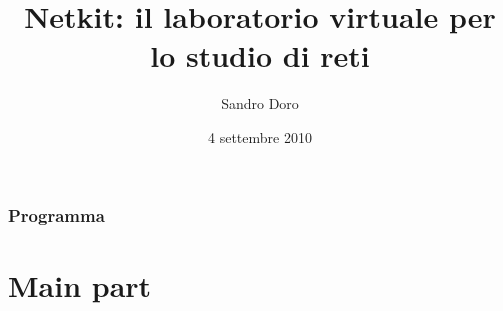 \documentclass{beamer}
\title{Netkit: il laboratorio virtuale per lo studio di reti}
\author{Sandro Doro}
\institute[ITIS ``C.Zuccante'' - Venezia--Mestre]{
  ITIS ``C.Zuccante'' - Venezia--Mestre\\
  Corso Serale Sirio}
\date{4 settembre 2010}
\begin{document}
\frame{\titlepage
}

\section*{Programma}



\part{Main part}

\end{document}
